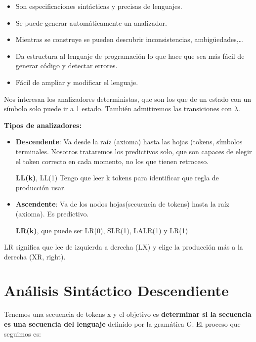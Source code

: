 \documentclass[12pt]{report} %
\begin{document}
\begin{itemize}

\item
  Son especificaciones sintácticas y precisas de lenguajes.
\item
  Se puede generar automáticamente un analizador.
\item
  Mientras se construye se pueden descubrir inconsistencias,
  ambigüedades,\ldots{}
\item
  Da estructura al lenguaje de programación lo que hace que sea más
  fácil de generar código y detectar errores.
\item
  Fácil de ampliar y modificar el lenguaje.
\end{itemize}

Nos interesan los analizadores deterministas, que son los que de un
estado con un símbolo solo puede ir a 1 estado. También admitiremos las
transiciones con \(\lambda\).

\textbf{Tipos de analizadores:}

\begin{itemize}
\item \textbf{Descendente}: Va desde la raíz (axioma) hasta las hojas
  (tokens, símbolos terminales. Nosotros trataremos los predictivos
  solo, que son capaces de elegir el token correcto en cada momento, no
  los que tienen retroceso.

  \textbf{LL(k)}, LL(1) Tengo que leer k tokens para identificar que
  regla de producción usar.
\item \textbf{Ascendente}: Va de los nodos hojas(secuencia de tokens) hasta
  la raíz (axioma). Es predictivo.

  \textbf{LR(k)}, que puede ser LR(0), SLR(1), LALR(1) y LR(1)
\end{itemize}

LR significa que lee de izquierda a derecha (LX) y elige la producción
más a la derecha (XR, right).

\section{Análisis Sintáctico Descendiente}

Tenemos una secuencia de tokens x y el objetivo es \textbf{determinar si
la secuencia es una secuencia del lenguaje} definido por la gramática G.
El proceso que seguimos es:
\end{document}

